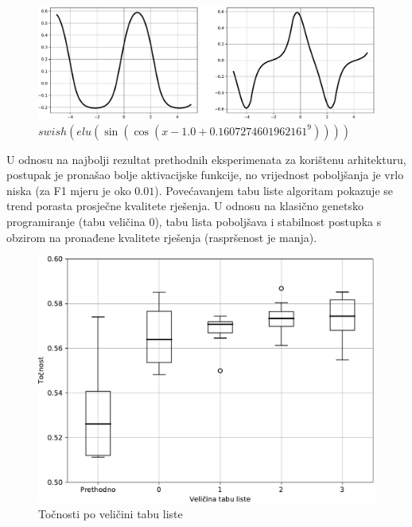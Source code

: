 \documentclass[times, utf8, numeric, diplomski]{fer}
\begin{document}
\begin{figure}[H]
\includegraphics[width=\textwidth]{dpav2_gp_f5.pdf}
\centering
\caption{$swish (elu (\sin (\cos (x - 1.0 + 0.1607274601962161^9))))$}
\label{fig:dpav2_gp_f5}
\end{figure}

U odnosu na najbolji rezultat prethodnih eksperimenata za korištenu arhitekturu, postupak je pronašao bolje aktivacijske funkcije, no vrijednost poboljšanja je vrlo niska (za F1 mjeru je oko $0.01$). Povećavanjem tabu liste algoritam pokazuje se trend porasta prosječne kvalitete rješenja. U odnosu na klasično genetsko programiranje (tabu veličina 0), tabu lista poboljšava i stabilnost postupka s obzirom na pronađene kvalitete rješenja (raspršenost je manja).

\begin{figure}[H]
\includegraphics[width=.9\textwidth]{GP_256class_acc_plus.pdf}
\centering
\caption{Točnosti po veličini tabu liste}
\label{fig:gp_256_acc}
\end{figure}
\end{document}
